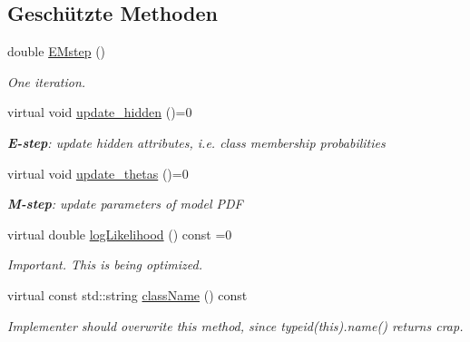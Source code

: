 \subsection*{Geschützte Methoden}
\begin{DoxyCompactItemize}
\item 
\hypertarget{classCDA_1_1EM_a27a47f19ff387ae50df6b3022a36d85b}{
double \hyperlink{classCDA_1_1EM_a27a47f19ff387ae50df6b3022a36d85b}{EMstep} ()}
\label{classCDA_1_1EM_a27a47f19ff387ae50df6b3022a36d85b}

\begin{DoxyCompactList}\small\item\em One iteration. \item\end{DoxyCompactList}\item 
\hypertarget{classCDA_1_1EM_af116066dfe282586d4219fb588a021d7}{
virtual void \hyperlink{classCDA_1_1EM_af116066dfe282586d4219fb588a021d7}{update\_\-hidden} ()=0}
\label{classCDA_1_1EM_af116066dfe282586d4219fb588a021d7}

\begin{DoxyCompactList}\small\item\em {\bfseries E-\/step}: update hidden attributes, i.e. class membership probabilities \item\end{DoxyCompactList}\item 
\hypertarget{classCDA_1_1EM_a58f0d0cf682d55a53e827744e03516e2}{
virtual void \hyperlink{classCDA_1_1EM_a58f0d0cf682d55a53e827744e03516e2}{update\_\-thetas} ()=0}
\label{classCDA_1_1EM_a58f0d0cf682d55a53e827744e03516e2}

\begin{DoxyCompactList}\small\item\em {\bfseries M-\/step}: update parameters of model PDF \item\end{DoxyCompactList}\item 
\hypertarget{classCDA_1_1EM_a8aa35411fba9041160319403163e92f6}{
virtual double \hyperlink{classCDA_1_1EM_a8aa35411fba9041160319403163e92f6}{logLikelihood} () const =0}
\label{classCDA_1_1EM_a8aa35411fba9041160319403163e92f6}

\begin{DoxyCompactList}\small\item\em Important. This is being optimized. \item\end{DoxyCompactList}\item 
\hypertarget{classCDA_1_1EM_a3508ac170afdf1034134d7764a3cd016}{
virtual const std::string \hyperlink{classCDA_1_1EM_a3508ac170afdf1034134d7764a3cd016}{className} () const }
\label{classCDA_1_1EM_a3508ac170afdf1034134d7764a3cd016}

\begin{DoxyCompactList}\small\item\em Implementer should overwrite this method, since typeid(this).name() returns crap. \item\end{DoxyCompactList}\end{DoxyCompactItemize}
